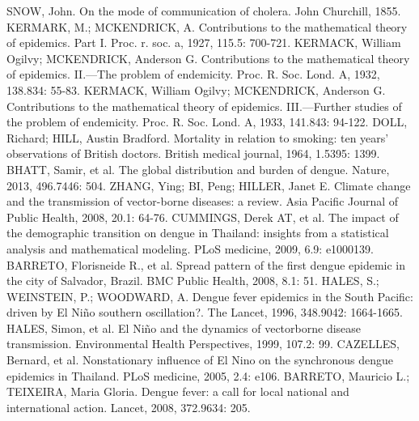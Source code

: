 \documentclass[a4paper,11pt,oneside]{book}
\begin{document}


\begin{thebibliography}{00}
SNOW, John. On the mode of communication of cholera. John Churchill, 1855.
KERMARK, M.; MCKENDRICK, A. Contributions to the mathematical theory of epidemics. Part I. Proc. r. soc. a, 1927, 115.5: 700-721.
KERMACK, William Ogilvy; MCKENDRICK, Anderson G. Contributions to the mathematical theory of epidemics. II.—The problem of endemicity. Proc. R. Soc. Lond. A, 1932, 138.834: 55-83.
KERMACK, William Ogilvy; MCKENDRICK, Anderson G. Contributions to the mathematical theory of epidemics. III.—Further studies of the problem of endemicity. Proc. R. Soc. Lond. A, 1933, 141.843: 94-122.
DOLL, Richard; HILL, Austin Bradford. Mortality in relation to smoking: ten years' observations of British doctors. British medical journal, 1964, 1.5395: 1399.
BHATT, Samir, et al. The global distribution and burden of dengue. Nature, 2013, 496.7446: 504.
ZHANG, Ying; BI, Peng; HILLER, Janet E. Climate change and the transmission of vector-borne diseases: a review. Asia Pacific Journal of Public Health, 2008, 20.1: 64-76.
CUMMINGS, Derek AT, et al. The impact of the demographic transition on dengue in Thailand: insights from a statistical analysis and mathematical modeling. PLoS medicine, 2009, 6.9: e1000139.
BARRETO, Florisneide R., et al. Spread pattern of the first dengue epidemic in the city of Salvador, Brazil. BMC Public Health, 2008, 8.1: 51.
HALES, S.; WEINSTEIN, P.; WOODWARD, A. Dengue fever epidemics in the South Pacific: driven by El Niño southern oscillation?. The Lancet, 1996, 348.9042: 1664-1665.
HALES, Simon, et al. El Niño and the dynamics of vectorborne disease transmission. Environmental Health Perspectives, 1999, 107.2: 99.
CAZELLES, Bernard, et al. Nonstationary influence of El Nino on the synchronous dengue epidemics in Thailand. PLoS medicine, 2005, 2.4: e106.
BARRETO, Mauricio L.; TEIXEIRA, Maria Gloria. Dengue fever: a call for local national and international action. Lancet, 2008, 372.9634: 205.

\end{thebibliography}
\end{document}
